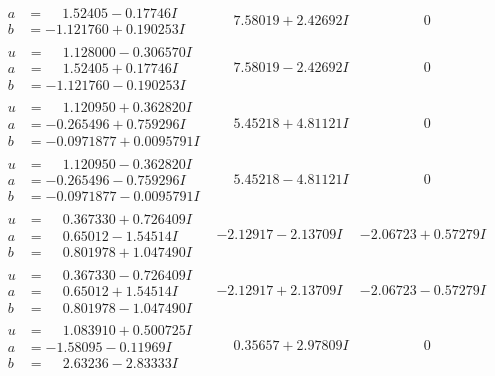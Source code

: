 \documentclass[1p]{elsarticle_modified}
\theoremstyle{definition}
\begin{document}
$$\begin{array}{c|c|c}
\begin{aligned}
a &= \phantom{-}1.52405 - 0.17746 I \\
b &= -1.121760 + 0.190253 I\end{aligned}
 & \phantom{-}7.58019 + 2.42692 I & \phantom{-0.000000 } 0 \\ \hline\begin{aligned}
u &= \phantom{-}1.128000 - 0.306570 I \\
a &= \phantom{-}1.52405 + 0.17746 I \\
b &= -1.121760 - 0.190253 I\end{aligned}
 & \phantom{-}7.58019 - 2.42692 I & \phantom{-0.000000 } 0 \\ \hline\begin{aligned}
u &= \phantom{-}1.120950 + 0.362820 I \\
a &= -0.265496 + 0.759296 I \\
b &= -0.0971877 + 0.0095791 I\end{aligned}
 & \phantom{-}5.45218 + 4.81121 I & \phantom{-0.000000 } 0 \\ \hline\begin{aligned}
u &= \phantom{-}1.120950 - 0.362820 I \\
a &= -0.265496 - 0.759296 I \\
b &= -0.0971877 - 0.0095791 I\end{aligned}
 & \phantom{-}5.45218 - 4.81121 I & \phantom{-0.000000 } 0 \\ \hline\begin{aligned}
u &= \phantom{-}0.367330 + 0.726409 I \\
a &= \phantom{-}0.65012 - 1.54514 I \\
b &= \phantom{-}0.801978 + 1.047490 I\end{aligned}
 & -2.12917 - 2.13709 I & -2.06723 + 0.57279 I \\ \hline\begin{aligned}
u &= \phantom{-}0.367330 - 0.726409 I \\
a &= \phantom{-}0.65012 + 1.54514 I \\
b &= \phantom{-}0.801978 - 1.047490 I\end{aligned}
 & -2.12917 + 2.13709 I & -2.06723 - 0.57279 I \\ \hline\begin{aligned}
u &= \phantom{-}1.083910 + 0.500725 I \\
a &= -1.58095 - 0.11969 I \\
b &= \phantom{-}2.63236 - 2.83333 I\end{aligned}
 & \phantom{-}0.35657 + 2.97809 I & \phantom{-0.000000 } 0 \\ \hline\begin{aligned}

\end{aligned}
\end{array}$$
\end{document}
